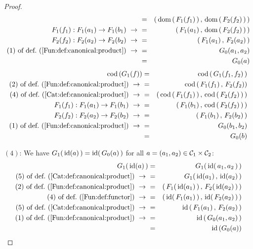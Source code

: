 \begin{proof}
\begin{eqnarray*}
            &=&(\,\dom\,(\,F_{1}(f_{1})\,)\,,\,\dom\,(\,F_{2}(f_{2})\,)\,)\\
            F_{1}(f_{1}):F_{1}(a_{1})\to F_{1}(b_{1})\ \to\ 
            &=&(\,F_{1}(a_{1})\,,\,\dom\,(\,F_{2}(f_{2})\,)\,)\\
            F_{2}(f_{2}):F_{2}(a_{2})\to F_{2}(b_{2})\ \to\ 
            &=&(\,F_{1}(a_{1})\,,\,F_{2}(a_{2})\,)\\
            \mbox{$(1)$ of def.~(\ref{Fun:def:canonical:product})}\ \to\ 
            &=&G_{0}(a_{1},a_{2})\\
            &=&G_{0}(a)
        \end{eqnarray*}
        \begin{eqnarray*}\cod\,(G_{1}(f))
            &=& \cod\,(\,G_{1}(f_{1},f_{2})\,)\\
            \mbox{$(2)$ of def.~(\ref{Fun:def:canonical:product})}\ \to\ 
            &=&\cod\,(\,F_{1}(f_{1})\,,\,F_{2}(f_{2}))\\
            \mbox{$(4)$ of def.~(\ref{Cat:def:canonical:product})}\ \to\ 
            &=&(\,\cod\,(\,F_{1}(f_{1})\,)\,,\,\cod\,(\,F_{2}(f_{2})\,)\,)\\
            F_{1}(f_{1}):F_{1}(a_{1})\to F_{1}(b_{1})\ \to\ 
            &=&(\,F_{1}(b_{1})\,,\,\cod\,(\,F_{2}(f_{2})\,)\,)\\
            F_{2}(f_{2}):F_{2}(a_{2})\to F_{2}(b_{2})\ \to\ 
            &=&(\,F_{1}(b_{1})\,,\,F_{2}(b_{2})\,)\\
            \mbox{$(1)$ of def.~(\ref{Fun:def:canonical:product})}\ \to\ 
            &=&G_{0}(b_{1},b_{2})\\
            &=&G_{0}(b)
        \end{eqnarray*}

    $(4)$: We have $G_{1}(\,\mbox{\rm id}(a)\,)=\mbox{\rm id}(\,G_{0}(a)\,)$ for all $a=(a_{1},a_{2})
    \in\mbox{${\cal C}_{1}$}\times\mbox{${\cal C}_{2}$}$:
        \begin{eqnarray*}G_{1}(\,\id(a)\,)
            &=&G_{1}(\,\id(\,a_{1},a_{2}\,)\,)\\
            \mbox{$(5)$ of def.~(\ref{Cat:def:canonical:product})}\ \to\ 
            &=&G_{1}(\,\id(a_{1})\,,\,\id(a_{2})\,)\\
            \mbox{$(2)$ of def.~(\ref{Fun:def:canonical:product})}\ \to\ 
            &=&(\,F_{1}(\,\id(a_{1})\,)\,,\,F_{2}(\,\id(a_{2})\,)\,)\\
            \mbox{$(4)$ of def.~(\ref{Fun:def:functor})}\ \to\ 
            &=&(\,\id(\,F_{1}(a_{1})\,)\,,\,\id(\,F_{2}(a_{2})\,)\,)\\
            \mbox{$(5)$ of def.~(\ref{Cat:def:canonical:product})}\ \to\ 
            &=&\id\,(\,F_{1}(a_{1})\,,\,F_{2}(a_{2})\,)\\
            \mbox{$(1)$ of def.~(\ref{Fun:def:canonical:product})}\ \to\ 
            &=&\id\,(\,G_{0}(a_{1},a_{2})\,)\\
            &=&\id\,(G_{0}(a))
        \end{eqnarray*}


\end{proof}
